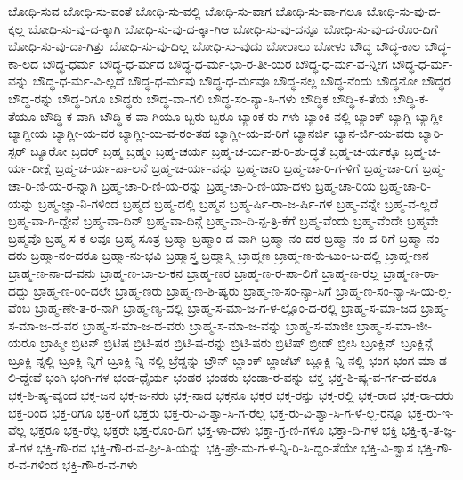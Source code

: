 {ಬೋಧಿ-ಸುವ
ಬೋಧಿ-ಸು-ವಂತೆ
ಬೋಧಿ-ಸು-ವಲ್ಲಿ
ಬೋಧಿ-ಸು-ವಾಗ
ಬೋಧಿ-ಸು-ವಾ-ಗಲೂ
ಬೋಧಿ-ಸು-ವು-ದ-ಕ್ಕಲ್ಲ
ಬೋಧಿ-ಸು-ವು-ದ-ಕ್ಕಾಗಿ
ಬೋಧಿ-ಸು-ವು-ದ-ಕ್ಕಾ-ಗಿಆ
ಬೋಧಿ-ಸು-ವು-ದನ್ನೂ
ಬೋಧಿ-ಸು-ವು-ದ-ರೊಂ-ದಿಗೆ
ಬೋಧಿ-ಸು-ವು-ದಾ-ಗಿತ್ತು
ಬೋಧಿ-ಸು-ವು-ದಿಲ್ಲ
ಬೋಧಿ-ಸು-ವುದು
ಬೋರಾಲು
ಬೋಳು
ಬೌದ್ಧ
ಬೌದ್ಧ-ಕಾಲ
ಬೌದ್ಧ-ಕಾ-ಲದ
ಬೌದ್ಧ-ಧರ್ಮ
ಬೌದ್ಧ-ಧ-ರ್ಮದ
ಬೌದ್ಧ-ಧ-ರ್ಮ-ಭಾ-ರ-ತೀ-ಯರ
ಬೌದ್ಧ-ಧ-ರ್ಮ-ವ-ನ್ನೀಗ
ಬೌದ್ಧ-ಧ-ರ್ಮ-ವನ್ನು
ಬೌದ್ಧ-ಧ-ರ್ಮ-ವಿ-ಲ್ಲದೆ
ಬೌದ್ಧ-ಧ-ರ್ಮವು
ಬೌದ್ಧ-ಧ-ರ್ಮವೂ
ಬೌದ್ಧ-ನಲ್ಲ
ಬೌದ್ಧ-ನೆಂದು
ಬೌದ್ಧನೋ
ಬೌದ್ಧರ
ಬೌದ್ಧ-ರನ್ನು
ಬೌದ್ಧ-ರಿಗೂ
ಬೌದ್ಧರು
ಬೌದ್ಧ-ವಾ-ಗಲಿ
ಬೌದ್ಧ-ಸಂ-ನ್ಯಾ-ಸಿ-ಗಳು
ಬೌದ್ಧಿಕ
ಬೌದ್ಧಿ-ಕ-ತೆಯ
ಬೌದ್ಧಿ-ಕ-ತೆಯೂ
ಬೌದ್ಧಿ-ಕ-ವಾಗಿ
ಬೌದ್ಧಿ-ಕ-ವಾ-ಗಿಯೂ
ಬ್ಬರು
ಬ್ಬರೂ
ಬ್ಯಾಂಕ-ರು-ಗಳು
ಬ್ಯಾಂಕಿ-ನಲ್ಲಿ
ಬ್ಯಾಂಕ್
ಬ್ಯಾಗ್ಲಿ
ಬ್ಯಾಗ್ಲೀ
ಬ್ಯಾಗ್ಲೀಯ
ಬ್ಯಾಗ್ಲೀ-ಯ-ವರ
ಬ್ಯಾಗ್ಲೀ-ಯ-ವ-ರಂ-ತಹ
ಬ್ಯಾಗ್ಲೀ-ಯ-ವ-ರಿಗೆ
ಬ್ಯಾನರ್ಜಿ
ಬ್ಯಾನ-ರ್ಜಿ-ಯ-ವರು
ಬ್ಯಾರಿ-ಸ್ಟರ್
ಬ್ಯೂರೋ
ಬ್ರದರ್
ಬ್ರಹ್ಮ
ಬ್ರಹ್ಮಂ
ಬ್ರಹ್ಮ-ಚರ್ಯ
ಬ್ರಹ್ಮ-ಚ-ರ್ಯ-ಪ-ರಿ-ಶು-ದ್ಧತೆ
ಬ್ರಹ್ಮ-ಚ-ರ್ಯಕ್ಕೂ
ಬ್ರಹ್ಮ-ಚ-ರ್ಯ-ದೀಕ್ಷೆ
ಬ್ರಹ್ಮ-ಚ-ರ್ಯ-ಪಾ-ಲನೆ
ಬ್ರಹ್ಮ-ಚ-ರ್ಯ-ವನ್ನು
ಬ್ರಹ್ಮ-ಚಾರಿ
ಬ್ರಹ್ಮ-ಚಾ-ರಿ-ಗ-ಳಿಗೆ
ಬ್ರಹ್ಮ-ಚಾ-ರಿಗೆ
ಬ್ರಹ್ಮ-ಚಾ-ರಿ-ಣಿ-ಯ-ರ-ನ್ನಾಗಿ
ಬ್ರಹ್ಮ-ಚಾ-ರಿ-ಣಿ-ಯ-ರನ್ನು
ಬ್ರಹ್ಮ-ಚಾ-ರಿ-ಣಿ-ಯಾ-ದಳು
ಬ್ರಹ್ಮ-ಚಾ-ರಿಯ
ಬ್ರಹ್ಮ-ಚಾ-ರಿ-ಯನ್ನು
ಬ್ರಹ್ಮ-ಜ್ಞಾ-ನಿ-ಗಳಿಂದ
ಬ್ರಹ್ಮದ
ಬ್ರಹ್ಮ-ದಲ್ಲಿ
ಬ್ರಹ್ಮನ
ಬ್ರಹ್ಮ-ರ್ಷಿ-ರಾ-ಜ-ರ್ಷಿ-ಗಳ
ಬ್ರಹ್ಮ-ವನ್ನೇ
ಬ್ರಹ್ಮ-ವ-ಲ್ಲದೆ
ಬ್ರಹ್ಮ-ವಾ-ಗಿ-ದ್ದೇನೆ
ಬ್ರಹ್ಮ-ವಾ-ದಿನ್
ಬ್ರಹ್ಮ-ವಾ-ದಿನ್ಗೆ
ಬ್ರಹ್ಮ-ವಾ-ದಿ-ನ್ಪ-ತ್ರಿ-ಕೆಗೆ
ಬ್ರಹ್ಮ-ವೆಂದು
ಬ್ರಹ್ಮ-ವೆಂದೇ
ಬ್ರಹ್ಮವೇ
ಬ್ರಹ್ಮವೊ
ಬ್ರಹ್ಮ-ಸ-ಕ-ಲವೂ
ಬ್ರಹ್ಮ-ಸೂತ್ರ
ಬ್ರಹ್ಮಾ
ಬ್ರಹ್ಮಾಂ-ಡ-ವಾಗಿ
ಬ್ರಹ್ಮಾ-ನಂ-ದರ
ಬ್ರಹ್ಮಾ-ನಂ-ದ-ರಿಗೆ
ಬ್ರಹ್ಮಾ-ನಂ-ದರು
ಬ್ರಹ್ಮಾ-ನಂ-ದರೂ
ಬ್ರಹ್ಮಾ-ನು-ಭವಿ
ಬ್ರಹ್ಮಾಸ್ತ್ರ
ಬ್ರಹ್ಮಾಸ್ಮಿ
ಬ್ರಾಹ್ಮಣ
ಬ್ರಾಹ್ಮ-ಣ-ಕು-ಟುಂ-ಬ-ದಲ್ಲಿ
ಬ್ರಾಹ್ಮ-ಣನ
ಬ್ರಾಹ್ಮ-ಣ-ನಾ-ದ-ವನು
ಬ್ರಾಹ್ಮ-ಣ-ಬಾ-ಲ-ಕನ
ಬ್ರಾಹ್ಮ-ಣರ
ಬ್ರಾಹ್ಮ-ಣ-ರ-ಪಾ-ಲಿಗೆ
ಬ್ರಾಹ್ಮ-ಣ-ರಲ್ಲ
ಬ್ರಾಹ್ಮ-ಣ-ರಾ-ದದ್ದು
ಬ್ರಾಹ್ಮ-ಣ-ರಿಂ-ದಲೇ
ಬ್ರಾಹ್ಮ-ಣರು
ಬ್ರಾಹ್ಮ-ಣ-ಶಿ-ಷ್ಯರು
ಬ್ರಾಹ್ಮ-ಣ-ಸಂ-ನ್ಯಾ-ಸಿಗೆ
ಬ್ರಾಹ್ಮ-ಣ-ಸಂ-ನ್ಯಾ-ಸಿ-ಯ-ಲ್ಲ-ವೆಂಬ
ಬ್ರಾಹ್ಮ-ಣೇ-ತ-ರ-ನಾಗಿ
ಬ್ರಾಹ್ಮ-ಣ್ಯ-ದಲ್ಲಿ
ಬ್ರಾಹ್ಮ-ಸ-ಮಾ-ಜ-ಗ-ಳ-ಲ್ಲೊಂ-ದ-ರಲ್ಲಿ
ಬ್ರಾಹ್ಮ-ಸ-ಮಾ-ಜದ
ಬ್ರಾಹ್ಮ-ಸ-ಮಾ-ಜ-ದ-ವರ
ಬ್ರಾಹ್ಮ-ಸ-ಮಾ-ಜ-ದ-ವರು
ಬ್ರಾಹ್ಮ-ಸ-ಮಾ-ಜ-ವನ್ನು
ಬ್ರಾಹ್ಮ-ಸ-ಮಾಜೀ
ಬ್ರಾಹ್ಮ-ಸ-ಮಾ-ಜೀ-ಯರೂ
ಬ್ರಾಹ್ಮೀ
ಬ್ರಿಟನ್
ಬ್ರಿಟಿಷ
ಬ್ರಿಟಿ-ಷರ
ಬ್ರಿಟಿ-ಷ-ರನ್ನು
ಬ್ರಿಟಿ-ಷರು
ಬ್ರಿಟಿಷ್
ಬ್ರೀಡ್
ಬ್ರೀಸಿ
ಬ್ರೂಕ್ಲಿನ್
ಬ್ರೂಕ್ಲಿನ್ಗೆ
ಬ್ರೂಕ್ಲಿ-ನ್ನಲ್ಲಿ
ಬ್ರೂಕ್ಲಿ-ನ್ನಿಗೆ
ಬ್ರೂಕ್ಲಿ-ನ್ನಿ-ನಲ್ಲಿ
ಬ್ರೆಡ್ಡನ್ನು
ಬ್ರೌನ್
ಬ್ಲಾಂಕ್
ಬ್ಲಾಜೆಟ್
ಬ್ಲೂಕ್ಲಿ-ನ್ನಿ-ನಲ್ಲಿ
ಭಂಗ
ಭಂಗ-ಮಾ-ಡ-ಲಿ-ದ್ದೇವೆ
ಭಂಗಿ
ಭಂಗಿ-ಗಳ
ಭಂಡ-ಧೈರ್ಯ
ಭಂಡರ
ಭಂಡರು
ಭಂಡಾ-ರ-ವನ್ನು
ಭಕ್ತ
ಭಕ್ತ-ಶಿ-ಷ್ಯ-ವ-ರ್ಗ-ದ-ವರೂ
ಭಕ್ತ-ಶಿ-ಷ್ಯ-ವೃಂದ
ಭಕ್ತ-ಜನ
ಭಕ್ತ-ಜ-ನರು
ಭಕ್ತ-ನಾದ
ಭಕ್ತನೂ
ಭಕ್ತರ
ಭಕ್ತ-ರನ್ನು
ಭಕ್ತ-ರಲ್ಲಿ
ಭಕ್ತ-ರಾದ
ಭಕ್ತ-ರಾ-ದರು
ಭಕ್ತ-ರಿಂದ
ಭಕ್ತ-ರಿಗೂ
ಭಕ್ತ-ರಿಗೆ
ಭಕ್ತರು
ಭಕ್ತ-ರು-ವಿ-ಶ್ವಾ-ಸಿ-ಗ-ರೆಲ್ಲ
ಭಕ್ತ-ರು-ವಿ-ಶ್ವಾ-ಸಿ-ಗ-ಳೆ-ಲ್ಲ-ರನ್ನೂ
ಭಕ್ತ-ರು-ಇ-ವೆಲ್ಲ
ಭಕ್ತರೂ
ಭಕ್ತ-ರೆಲ್ಲ
ಭಕ್ತರೇ
ಭಕ್ತ-ರೊಂ-ದಿಗೆ
ಭಕ್ತ-ಳಾ-ದಳು
ಭಕ್ತಾ-ಗ್ರ-ಣಿ-ಗಳೂ
ಭಕ್ತಾ-ದಿ-ಗಳ
ಭಕ್ತಿ
ಭಕ್ತಿ-ಕೃ-ತ-ಜ್ಞ-ತೆ-ಗಳ
ಭಕ್ತಿ-ಗೌ-ರವ
ಭಕ್ತಿ-ಗೌ-ರ-ವ-ಪ್ರೀ-ತಿ-ಯನ್ನು
ಭಕ್ತಿ-ಪ್ರೇ-ಮ-ಗ-ಳ-ನ್ನಿ-ರಿ-ಸಿ-ದ್ದಂ-ತೆಯೇ
ಭಕ್ತಿ-ವಿ-ಶ್ವಾಸ
ಭಕ್ತಿ-ಗೌ-ರ-ವ-ಗಳಿಂದ
ಭಕ್ತಿ-ಗೌ-ರ-ವ-ಗಳು
}
